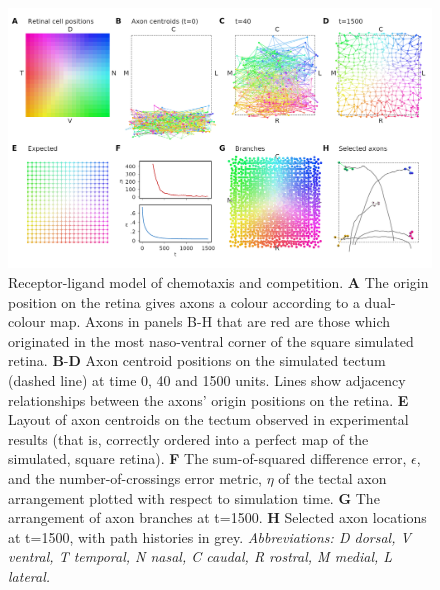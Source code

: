 \documentclass[9pt,lineno,draft]{elife}
\begin{document}
\begin{figure}
\begin{fullwidth}
\includegraphics[width=0.95\linewidth]{./images/j4_ee_GJ_best_1_wt_fig2_exit_true_steps_1500.png}
\caption{Receptor-ligand model of chemotaxis and competition.
\textbf{A} The origin position on the retina gives axons a colour according to a dual-colour map. Axons in panels B-H that are red are those which originated in the most naso-ventral corner of the square simulated retina.
\textbf{B}-\textbf{D} Axon centroid positions on the simulated tectum (dashed line) at time 0, 40 and 1500 units. Lines show adjacency relationships between the axons' origin positions on the retina.
\textbf{E} Layout of axon centroids on the tectum observed in experimental results (that is, correctly ordered into a perfect map of the simulated, square retina).
\textbf{F} The sum-of-squared difference error, $\epsilon$, and the number-of-crossings error metric, $\eta$ of the tectal axon arrangement plotted with respect to simulation time.
\textbf{G} The arrangement of axon branches at t=1500.
\textbf{H} Selected axon locations at t=1500, with path histories in grey.
\emph{Abbreviations: D dorsal, V ventral, T temporal, N nasal, C caudal, R rostral, M medial, L lateral.}}
\label{f:GJ}
\end{fullwidth}
\end{figure}
\end{document}

